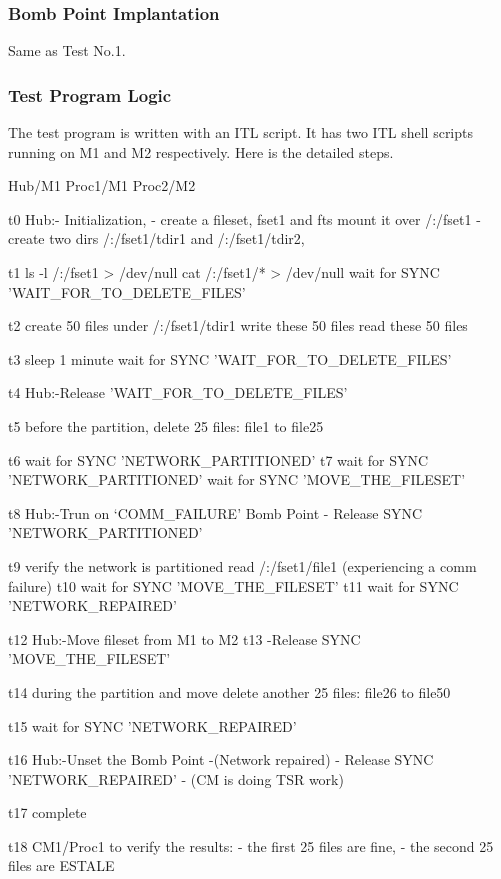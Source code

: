 \subsubsection {Bomb Point Implantation}

Same as Test No.1.

\subsubsection {Test Program Logic}

The test program is written with an ITL script. It has two ITL shell scripts
running on M1 and M2 respectively. Here is the detailed steps. 

\begin{programexample}

    Hub/M1		Proc1/M1			Proc2/M2
	 	 
t0  Hub:- Initialization,
	- create a fileset, fset1 and fts mount it over /:/fset1
	- create two dirs /:/fset1/tdir1 and /:/fset1/tdir2, 

t1							ls -l /:/fset1  > /dev/null
							cat /:/fset1/* > /dev/null
							wait for SYNC 'WAIT_FOR_TO_DELETE_FILES'

t2			create 50 files under 
			/:/fset1/tdir1
			write these 50 files
			read these 50 files

t3			sleep 1 minute
			wait for SYNC 'WAIT_FOR_TO_DELETE_FILES'

t4  Hub:-Release 'WAIT_FOR_TO_DELETE_FILES'

t5							before the partition,
							delete 25 files: file1 to file25


t6			wait for SYNC 'NETWORK_PARTITIONED'
t7							wait for SYNC 'NETWORK_PARTITIONED'
							wait for SYNC 'MOVE_THE_FILESET'

t8  Hub:-Trun on `COMM_FAILURE' Bomb Point
	- Release SYNC 'NETWORK_PARTITIONED'

t9			verify the network is partitioned
			read /:/fset1/file1 
			(experiencing a comm failure)
t10			wait for SYNC 'MOVE_THE_FILESET'
t11			wait for SYNC 'NETWORK_REPAIRED'
		
t12 Hub:-Move fileset from M1 to M2
t13	-Release SYNC 'MOVE_THE_FILESET'

t14							during the partition and move
							delete another 25 files: file26 to file50

t15							wait for SYNC 'NETWORK_REPAIRED'

t16 Hub:-Unset the Bomb Point 
	-(Network repaired)
	- Release SYNC 'NETWORK_REPAIRED'
	- (CM is doing TSR work)

t17							complete

t18			CM1/Proc1 to verify the results:
			- the first 25 files are fine,		
			- the second 25 files are ESTALE

\end{programexample}


